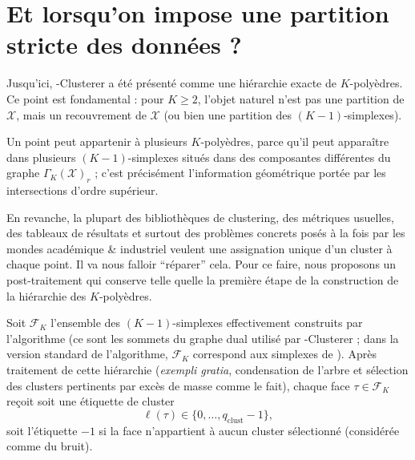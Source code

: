 
\section{Et lorsqu'on impose une partition stricte des données ?}
\label{sec:chapV_partition_stricte}

Jusqu'ici, \HGP-Clusterer a été présenté comme une hiérarchie exacte de $K$-polyèdres. Ce point est fondamental : pour $K\ge2$, l'objet naturel n'est pas une partition de $\mathcal X$, mais un recouvrement de $\mathcal X$ (ou bien une partition des $(K-1)$-simplexes). 

Un point peut appartenir à plusieurs $K$-polyèdres, parce qu'il peut apparaître dans plusieurs $(K-1)$-simplexes situés dans des composantes différentes du graphe $\Gamma_K(\mathcal X)_r$ ; c'est précisément l'information géométrique portée par les intersections d'ordre supérieur.

En revanche, la plupart des bibliothèques de clustering, des métriques usuelles, des tableaux de résultats et surtout des problèmes concrets posés à la fois par les mondes académique \& industriel veulent une assignation unique d'un cluster à chaque point. 
Il va nous falloir ``réparer'' cela. Pour ce faire, nous proposons un post-traitement qui conserve telle quelle la première étape de la construction de la hiérarchie des $K$-polyèdres.

Soit $\mathcal F_K$ l'ensemble des $(K-1)$-simplexes effectivement construits par l'algorithme (ce sont les sommets du graphe dual utilisé par \HGP-Clusterer ; dans la version standard de l'algorithme, $\mathcal F_K$ correspond aux simplexes de ). 
Après traitement de cette hiérarchie (\emph{exempli gratia}, condensation de l'arbre et sélection des clusters pertinents par excès de masse comme \HDBSCAN \cite{HDBSCAN2017} le fait), chaque face $\tau\in\mathcal F_K$ reçoit soit une étiquette de cluster
\[
    \ell(\tau)\in \{0,\ldots, q_\mathrm{clust}-1\},
\]
soit l'étiquette $-1$ si la face n'appartient à aucun cluster sélectionné (considérée comme du bruit).

